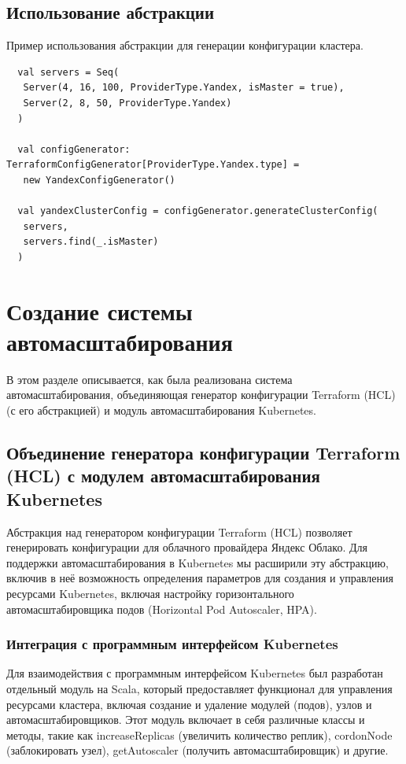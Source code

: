   \subsection{Использование абстракции}
  
  Пример использования абстракции для генерации конфигурации кластера.
  
  \begin{verbatim}
  val servers = Seq(
   Server(4, 16, 100, ProviderType.Yandex, isMaster = true),
   Server(2, 8, 50, ProviderType.Yandex)
  )
  
  val configGenerator: TerraformConfigGenerator[ProviderType.Yandex.type] =
   new YandexConfigGenerator()
  
  val yandexClusterConfig = configGenerator.generateClusterConfig(
   servers,
   servers.find(_.isMaster)
  )
  \end{verbatim}
  
  \section{Создание системы автомасштабирования}
  
  В этом разделе описывается, как была реализована система автомасштабирования,
объединяющая генератор конфигурации Terraform (HCL) (с его абстракцией) и модуль
автомасштабирования Kubernetes.
  
  \subsection{Объединение генератора конфигурации Terraform (HCL) с модулем
автомасштабирования Kubernetes}
  
  Абстракция над генератором конфигурации Terraform (HCL) позволяет генерировать
конфигурации для облачного провайдера Яндекс Облако. Для поддержки
автомасштабирования в Kubernetes мы расширили эту абстракцию, включив в неё
возможность определения параметров для создания и управления ресурсами
Kubernetes, включая настройку горизонтального автомасштабировщика подов
(Horizontal Pod Autoscaler, HPA).
  
  \subsubsection{Интеграция с программным интерфейсом Kubernetes}
  
  Для взаимодействия с программным интерфейсом Kubernetes был разработан
отдельный модуль на Scala, который предоставляет функционал для управления
ресурсами кластера, включая создание и удаление модулей (подов), узлов и
автомасштабировщиков. Этот модуль включает в себя различные классы и методы,
такие как increaseReplicas (увеличить количество реплик), cordonNode
(заблокировать узел), getAutoscaler (получить автомасштабировщик) и другие.
  
